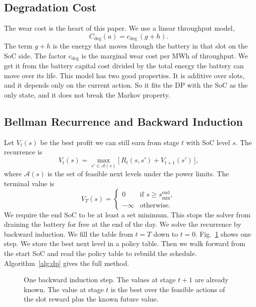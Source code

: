 \documentclass[conference,a4paper]{IEEEtran}
\begin{document}
\subsection{Degradation Cost}
The wear cost is the heart of this paper. We use a linear throughput model,
\begin{equation}
C_{\text{deg}}(a) = c_{\text{deg}}\,(g + h).
\label{eq:deg}
\end{equation}
The term $g+h$ is the energy that moves through the battery in that slot on the
SoC side. The factor $c_{\text{deg}}$ is the marginal wear cost per MWh of
throughput. We get it from the battery capital cost divided by the total
energy the battery can move over its life. This model has two good properties.
It is additive over slots, and it depends only on the current action. So it
fits the DP with the SoC as the only state, and it does not break the Markov
property.

\subsection{Bellman Recurrence and Backward Induction}
Let $V_t(s)$ be the best profit we can still earn from stage $t$ with SoC
level $s$. The recurrence is
\begin{equation}
V_t(s) = \max_{s' \in \mathcal{A}(s)} \big[\, R_t(s,s') + V_{t+1}(s') \,\big],
\label{eq:bellman}
\end{equation}
where $\mathcal{A}(s)$ is the set of feasible next levels under the power
limits. The terminal value is
\begin{equation}
V_T(s) = \begin{cases} 0 & \text{if } s \ge s_{\min}^{\text{end}},\\
-\infty & \text{otherwise.} \end{cases}
\end{equation}
We require the end SoC to be at least a set minimum. This stops the solver
from draining the battery for free at the end of the day. We solve the
recurrence by backward induction. We fill the table from $t=T$ down to $t=0$.
Fig.~\ref{fig:backward} shows one step. We store the best next level in a
policy table. Then we walk forward from the start SoC and read the policy
table to rebuild the schedule. Algorithm~\ref{alg:dp} gives the full method.

\begin{figure}[t]
\centering

\caption{One backward induction step. The values at stage $t{+}1$ are already
known. The value at stage $t$ is the best over the feasible actions of the
slot reward plus the known future value.}
\label{fig:backward}
\end{figure}
\end{document}
